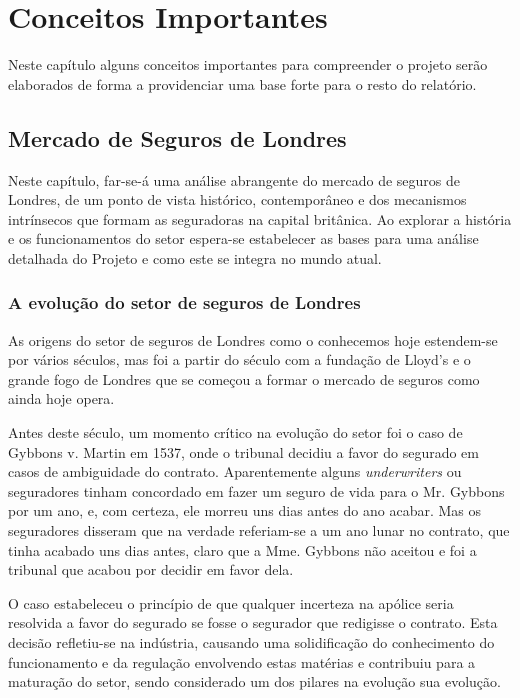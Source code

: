 \section{Conceitos Importantes}\label{sec:conceitos}

    Neste capítulo alguns conceitos importantes para compreender o projeto serão elaborados de forma a providenciar uma base forte para o resto do relatório. 

    \subsection{Mercado de Seguros de Londres}\label{sec:mercado-de-seguros-londres}

        Neste capítulo, far-se-á uma análise abrangente do mercado de seguros de Londres, de um ponto de vista histórico, contemporâneo e dos mecanismos intrínsecos que formam as seguradoras na capital britânica. Ao explorar a história e os funcionamentos do setor espera-se estabelecer as bases para uma análise detalhada do Projeto e como este se integra no mundo atual.

        \subsubsection{A evolução do setor de seguros de Londres}\label{secsec:a-evolucao-do-setor-de-seguros-de-londres}
    
            As origens do setor de seguros de Londres como o conhecemos hoje estendem-se por vários séculos, mas foi a partir do século  com a fundação de Lloyd's e o grande fogo de Londres que se começou a formar o mercado de seguros como ainda hoje opera. 
        
            Antes deste século, um momento crítico na evolução do setor foi o caso de Gybbons v. Martin em 1537, onde o tribunal decidiu a favor do segurado em casos de ambiguidade do contrato. Aparentemente alguns \textit{underwriters} ou seguradores tinham concordado em fazer um seguro de vida para o Mr. Gybbons por um ano, e, com certeza, ele morreu uns dias antes do ano acabar. Mas os seguradores disseram que na verdade referiam-se a um ano lunar no contrato, que tinha acabado uns dias antes, claro que a Mme. Gybbons não aceitou e foi a tribunal que acabou por decidir em favor dela. 
            
            O caso estabeleceu o princípio de que qualquer incerteza na apólice seria resolvida a favor do segurado se fosse o segurador que redigisse o contrato. Esta decisão refletiu-se na indústria, causando uma solidificação do conhecimento do funcionamento e da regulação envolvendo estas matérias e contribuiu para a maturação do setor, sendo considerado um dos pilares na evolução sua evolução.  
        

